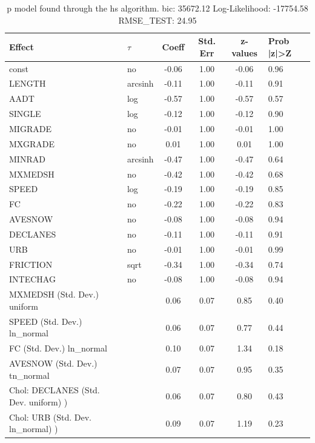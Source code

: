 \begin{table}
	\caption{p model found through the hs algorithm. bic: 35672.12 Log-Likelihood: -17754.58 RMSE_TEST: 24.95}
	\begin{center}
		\begin{tabular}{|l|l|c|c|c|l|}
			\hline
			Effect & $\tau$ & Coeff & Std. Err & z-values & Prob |z|>Z \\
			\hline
			const & no & -0.06 & 1.00 & -0.06 & 0.96 \\
			\hline
			LENGTH & arcsinh & -0.11 & 1.00 & -0.11 & 0.91 \\
			\hline
			AADT & log & -0.57 & 1.00 & -0.57 & 0.57 \\
			\hline
			SINGLE & log & -0.12 & 1.00 & -0.12 & 0.90 \\
			\hline
			MIGRADE & no & -0.01 & 1.00 & -0.01 & 1.00 \\
			\hline
			MXGRADE & no & 0.01 & 1.00 & 0.01 & 1.00 \\
			\hline
			MINRAD & arcsinh & -0.47 & 1.00 & -0.47 & 0.64 \\
			\hline
			MXMEDSH & no & -0.42 & 1.00 & -0.42 & 0.68 \\
			\hline
			SPEED & log & -0.19 & 1.00 & -0.19 & 0.85 \\
			\hline
			FC & no & -0.22 & 1.00 & -0.22 & 0.83 \\
			\hline
			AVESNOW & no & -0.08 & 1.00 & -0.08 & 0.94 \\
			\hline
			DECLANES & no & -0.11 & 1.00 & -0.11 & 0.91 \\
			\hline
			URB & no & -0.01 & 1.00 & -0.01 & 0.99 \\
			\hline
			FRICTION & sqrt & -0.34 & 1.00 & -0.34 & 0.74 \\
			\hline
			INTECHAG & no & -0.08 & 1.00 & -0.08 & 0.94 \\
			\hline
			MXMEDSH (Std. Dev.) uniform &  & 0.06 & 0.07 & 0.85 & 0.40 \\
			\hline
			SPEED (Std. Dev.) ln_normal &  & 0.06 & 0.07 & 0.77 & 0.44 \\
			\hline
			FC (Std. Dev.) ln_normal &  & 0.10 & 0.07 & 1.34 & 0.18 \\
			\hline
			AVESNOW (Std. Dev.) tn_normal &  & 0.07 & 0.07 & 0.95 & 0.35 \\
			\hline
			 Chol: DECLANES (Std. Dev. uniform) ) &  & 0.06 & 0.07 & 0.80 & 0.43 \\
			\hline
			 Chol: URB (Std. Dev. ln_normal) ) &  & 0.09 & 0.07 & 1.19 & 0.23 \\
			\hline

\end{tabular}
\end{center}
\end{table}
